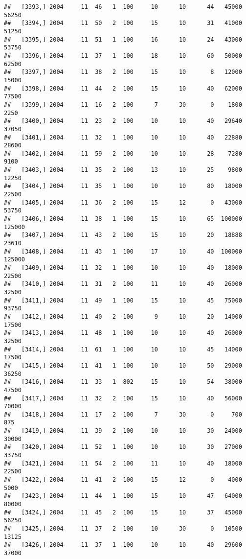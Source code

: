 \documentclass{article}\usepackage[]{graphicx}\usepackage[]{color}
\makeatletter
\newenvironment{kframe}{%
 \def\at@end@of@kframe{}%
 \ifinner\ifhmode%
  \def\at@end@of@kframe{\end{minipage}}%
  \begin{minipage}{\columnwidth}%
 \fi\fi%
 \def\FrameCommand##1{\hskip\@totalleftmargin \hskip-\fboxsep
 \colorbox{shadecolor}{##1}\hskip-\fboxsep
     \hskip-\linewidth \hskip-\@totalleftmargin \hskip\columnwidth}%
 \MakeFramed {\advance\hsize-\width
   \@totalleftmargin\z@ \linewidth\hsize
   \@setminipage}}%
 {\par\unskip\endMakeFramed%
 \at@end@of@kframe}
\newenvironment{knitrout}{}{} %
\makeatother
\begin{document}
\begin{knitrout}
\begin{kframe}
\begin{verbatim}
##   [3393,] 2004     11  46   1  100     10      10      44   45000   56250
##   [3394,] 2004     11  50   2  100     15      10      31   41000   51250
##   [3395,] 2004     11  51   1  100     16      10      24   43000   53750
##   [3396,] 2004     11  37   1  100     18      10      60   50000   62500
##   [3397,] 2004     11  38   2  100     15      10       8   12000   15000
##   [3398,] 2004     11  44   2  100     15      10      40   62000   77500
##   [3399,] 2004     11  16   2  100      7      30       0    1800    2250
##   [3400,] 2004     11  23   2  100     10      10      40   29640   37050
##   [3401,] 2004     11  32   1  100     10      10      40   22880   28600
##   [3402,] 2004     11  59   2  100     10      10      28    7280    9100
##   [3403,] 2004     11  35   2  100     13      10      25    9800   12250
##   [3404,] 2004     11  35   1  100     10      10      80   18000   22500
##   [3405,] 2004     11  36   2  100     15      12       0   43000   53750
##   [3406,] 2004     11  38   1  100     15      10      65  100000  125000
##   [3407,] 2004     11  43   2  100     15      10      20   18888   23610
##   [3408,] 2004     11  43   1  100     17      10      40  100000  125000
##   [3409,] 2004     11  32   1  100     10      10      40   18000   22500
##   [3410,] 2004     11  31   2  100     11      10      40   26000   32500
##   [3411,] 2004     11  49   1  100     15      10      45   75000   93750
##   [3412,] 2004     11  40   2  100      9      10      20   14000   17500
##   [3413,] 2004     11  48   1  100     10      10      40   26000   32500
##   [3414,] 2004     11  61   1  100     10      10      45   14000   17500
##   [3415,] 2004     11  41   1  100     10      10      50   29000   36250
##   [3416,] 2004     11  33   1  802     15      10      54   38000   47500
##   [3417,] 2004     11  32   2  100     15      10      40   56000   70000
##   [3418,] 2004     11  17   2  100      7      30       0     700     875
##   [3419,] 2004     11  39   2  100     10      10      30   24000   30000
##   [3420,] 2004     11  52   1  100     10      10      30   27000   33750
##   [3421,] 2004     11  54   2  100     11      10      40   18000   22500
##   [3422,] 2004     11  41   2  100     15      12       0    4000    5000
##   [3423,] 2004     11  44   1  100     15      10      47   64000   80000
##   [3424,] 2004     11  45   2  100     15      10      37   45000   56250
##   [3425,] 2004     11  37   2  100     10      30       0   10500   13125
##   [3426,] 2004     11  37   1  100     10      10      40   29600   37000

\end{verbatim}
\end{kframe}
\end{knitrout}
\end{document}

